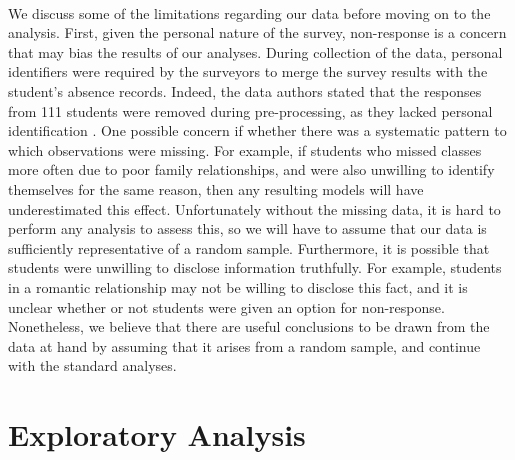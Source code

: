 \documentclass[12pt, titlepage]{article}
\begin{document}
	\paragraph{} We discuss some of the limitations regarding our data before moving on to the analysis. First, given the personal nature of the survey, non-response is a concern that may bias the results of our analyses. During collection of the data, personal identifiers were required by the surveyors to merge the survey results with the student's absence records. Indeed, the data authors stated that the responses from 111 students were removed during pre-processing, as they lacked personal identification \cite{Cortez::2008}. One possible concern if whether there was a systematic pattern to which observations were missing. For example, if students who missed classes more often due to poor family relationships, and were also unwilling to identify themselves for the same reason, then any resulting models will have underestimated this effect. Unfortunately without the missing data, it is hard to perform any analysis to assess this, so we will have to assume that our data is sufficiently representative of a random sample. Furthermore, it is possible that students were unwilling to disclose information truthfully. For example, students in a romantic relationship may not be willing to disclose this fact, and it is unclear whether or not students were given an option for non-response. Nonetheless, we believe that there are useful conclusions to be drawn from the data at hand by assuming that it arises from a random sample, and continue with the standard analyses. 
	
	\section{Exploratory Analysis}
	
\end{document}
